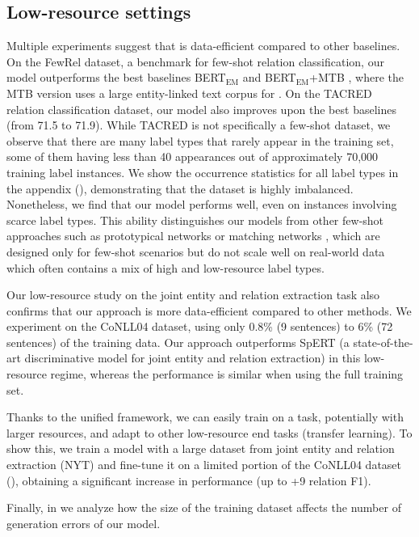 \subsection{Low-resource settings} \label{sec:exp_low_resource}
Multiple experiments suggest that \ourmodel{} is data-efficient compared to other baselines.
On the FewRel dataset, a benchmark for few-shot relation classification, our model outperforms the best baselines BERT$_{\text{EM}}$ and BERT$_{\text{EM}}$+MTB \citep{bert,matching_the_blank}, where the MTB version uses a large entity-linked text corpus for \pretraining.
On the TACRED relation classification dataset, our model also improves upon the best baselines (from 71.5 to 71.9).
While TACRED is not specifically a few-shot dataset, we observe that there are many label types that rarely appear in the training set, some of them having less than 40 appearances out of approximately 70,000 training label instances.
We show the occurrence statistics for all label types in the appendix (), demonstrating that the dataset is highly imbalanced.
Nonetheless, we find that our model performs well, even on instances involving scarce label types. 
This ability distinguishes our models from other few-shot approaches such as prototypical networks \citep{protonet} or matching networks \citep{matching_net}, which are designed only for few-shot scenarios but do not scale well on real-world data which often contains a mix of high and low-resource label types. 

Our low-resource study on the joint entity and relation extraction task also confirms that our approach is more data-efficient compared to other methods.
We experiment on the CoNLL04 dataset, using only 0.8\% (9 sentences) to 6\% (72 sentences) of the training data. Our approach outperforms SpERT (a state-of-the-art discriminative model for joint entity and relation extraction) in this low-resource regime, whereas the performance is similar when using the full training set.

Thanks to the unified framework, we can easily train on a task, potentially with larger resources, and adapt to other low-resource end tasks (transfer learning). To show this, we train a model with a large dataset from joint entity and relation extraction (NYT) and fine-tune it on a limited portion of the CoNLL04 dataset (), obtaining a significant increase in performance (up to +9 relation F1).

Finally, in  we analyze how the size of the training dataset affects the number of generation errors of our model.

